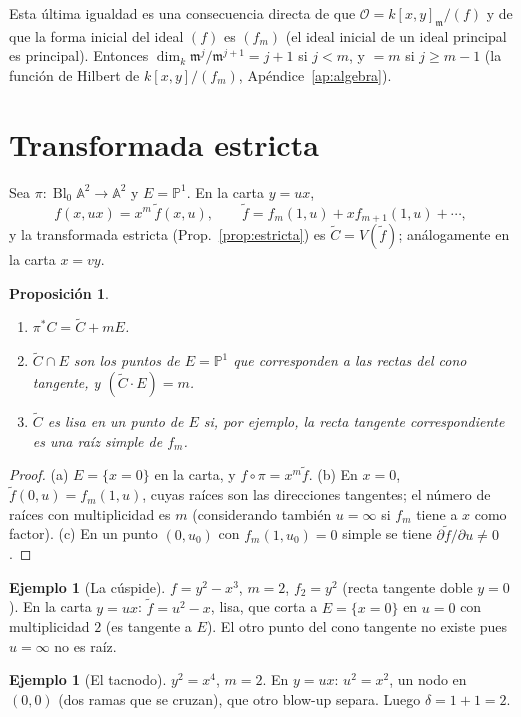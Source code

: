 \documentclass[11pt,a4paper,oneside]{book}
\newcommand{\Bl}{\operatorname{Bl}}
\newcommand{\A}{\mathbb{A}}
\newcommand{\PP}{\mathbb{P}}
\newcommand{\cO}{\mathcal{O}}
\theoremstyle{plain}
\newtheorem{proposicion}[teorema]{Proposición}
\theoremstyle{definition}
\newtheorem{ejemplo}[teorema]{Ejemplo}
\theoremstyle{remark}
\begin{document}
Esta última igualdad es una consecuencia directa de que $\cO=k[x,y]_{\mathfrak m}/(f)$ y de que la forma inicial del ideal $(f)$ es $(f_m)$ (el ideal inicial de un ideal principal es principal). Entonces $\dim_k\mathfrak m^j/\mathfrak m^{j+1}=j+1$ si $j<m$, y $=m$ si $j\ge m-1$ (la función de Hilbert de $k[x,y]/(f_m)$, Apéndice~\ref{ap:algebra}).

\section{Transformada estricta}

Sea $\pi:\Bl_0\A^2\to\A^2$ y $E=\PP^1$. En la carta $y=ux$,
\[
f(x,ux)=x^m\,\tilde f(x,u),\qquad \tilde f=f_m(1,u)+xf_{m+1}(1,u)+\cdots,
\]
y la transformada estricta (Prop.~\ref{prop:estricta}) es $\tilde C=V(\tilde f)$; análogamente en la carta $x=vy$.

\begin{proposicion}\label{prop:curvas}
\begin{enumerate}[label=(\alph*)]
\item $\pi^*C=\tilde C+mE$.
\item $\tilde C\cap E$ son los puntos de $E=\PP^1$ que corresponden a las rectas del cono tangente, y $(\tilde C\cdot E)=m$.
\item $\tilde C$ es lisa en un punto de $E$ si, por ejemplo, la recta tangente correspondiente es una raíz simple de $f_m$.
\end{enumerate}
\end{proposicion}

\begin{proof}
(a) $E=\{x=0\}$ en la carta, y $f\circ\pi=x^m\tilde f$. (b) En $x=0$, $\tilde f(0,u)=f_m(1,u)$, cuyas raíces son las direcciones tangentes; el número de raíces con multiplicidad es $m$ (considerando también $u=\infty$ si $f_m$ tiene a $x$ como factor). (c) En un punto $(0,u_0)$ con $f_m(1,u_0)=0$ simple se tiene $\partial\tilde f/\partial u\ne0$.
\end{proof}

\begin{ejemplo}[La cúspide]\label{ej:cuspide}
$f=y^2-x^3$, $m=2$, $f_2=y^2$ (recta tangente doble $y=0$). En la carta $y=ux$: $\tilde f=u^2-x$, lisa, que corta a $E=\{x=0\}$ en $u=0$ con multiplicidad $2$ (es tangente a $E$). El otro punto del cono tangente no existe pues $u=\infty$ no es raíz.
\end{ejemplo}

\begin{ejemplo}[El tacnodo]
$y^2=x^4$, $m=2$. En $y=ux$: $u^2=x^2$, un nodo en $(0,0)$ (dos ramas que se cruzan), que otro blow-up separa. Luego $\delta=1+1=2$.
\end{ejemplo}
\end{document}
